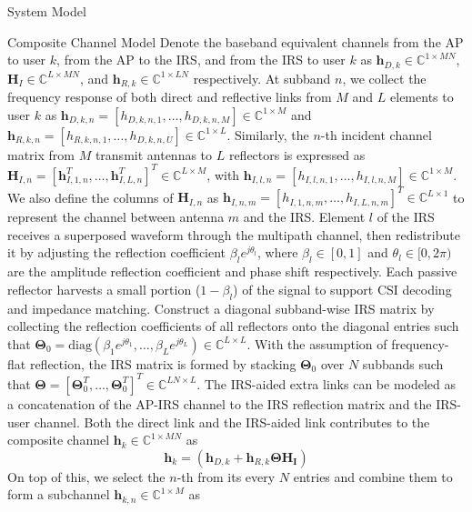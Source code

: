\documentclass{IEEEtran}
\begin{document}
\begin{section} {System Model}
\begin{subsection}	{Composite Channel Model}
		Denote the baseband equivalent channels from the AP to user $k$, from the AP to the IRS, and from the IRS to user $k$ as $\boldsymbol{h}_{D,k} \in \mathbb{C}^{1 \times MN}$, $\boldsymbol{H}_I \in \mathbb{C}^{L \times MN}$, and $\boldsymbol{h}_{R,k} \in \mathbb{C}^{1 \times LN}$ respectively. At subband $n$, we collect the frequency response of both direct and reflective links from $M$ and $L$ elements to user $k$ as $\boldsymbol{h}_{D,k,n}=[h_{D,k,n,1},\dots,h_{D,k,n,M}] \in \mathbb{C}^{1 \times M}$ and $\boldsymbol{h}_{R,k,n}=[h_{R,k,n,1},\dots,h_{D,k,n,U}] \in \mathbb{C}^{1 \times L}$. Similarly, the $n$-th incident channel matrix from $M$ transmit antennas to $L$ reflectors is expressed as $\boldsymbol{H}_{I,n}=[\boldsymbol{h}_{I,1,n}^T,\dots,\boldsymbol{h}_{I,L,n}^T]^T \in \mathbb{C}^{L \times M}$, with $\boldsymbol{h}_{I,l,n}=[h_{I,l,n,1},\dots,h_{I,l,n,M}] \in \mathbb{C}^{1 \times M}$. We also define the columns of $\boldsymbol{H}_{I,n}$ as $\boldsymbol{h}_{I,n,m}=[h_{I,1,n,m},\dots,h_{I,L,n,m}]^T \in \mathbb{C}^{L \times 1}$ to represent the channel between antenna $m$ and the IRS. Element $l$ of the IRS receives a superposed waveform through the multipath channel, then redistribute it by adjusting the reflection coefficient $\beta_l e^{j \theta_l}$, where $\beta_l \in [0,1]$ and $\theta_l \in [0,2\pi)$ are the amplitude reflection coefficient and phase shift respectively. Each passive reflector harvests a small portion ($1 - \beta_l$) of the signal to support CSI decoding and impedance matching. Construct a diagonal subband-wise IRS matrix by collecting the reflection coefficients of all reflectors onto the diagonal entries such that $\boldsymbol{\Theta}_0 = \text{diag}(\beta_1 e^{j \theta_1}, \dots, \beta_L e^{j \theta_L}) \in \mathbb{C}^{L \times L}$. With the assumption of frequency-flat reflection, the IRS matrix is formed by stacking $\boldsymbol{\Theta}_0$ over $N$ subbands such that $\boldsymbol{\Theta} = [\boldsymbol{\Theta}_0^T,\dots,\boldsymbol{\Theta}_0^T]^T \in \mathbb{C}^{LN \times L}$. The IRS-aided extra links can be modeled as a concatenation of the AP-IRS channel to the IRS reflection matrix and the IRS-user channel. Both the direct link and the IRS-aided link contributes to the composite channel $\boldsymbol{h}_k \in \mathbb{C}^{1 \times MN}$ as
		\begin{equation}	\label{eq:h_k}
			\boldsymbol{h}_k = \left( \boldsymbol{h}_{D,k}+\boldsymbol{h}_{R,k} \boldsymbol{\Theta} \boldsymbol{\boldsymbol{H}_I} \right)
		\end{equation}
		On top of this, we select the $n$-th from its every $N$ entries and combine them to form a subchannel $\boldsymbol{h}_{k,n} \in \mathbb{C}^{1 \times M}$ as

\end{subsection}
\end{section}
\end{document}
